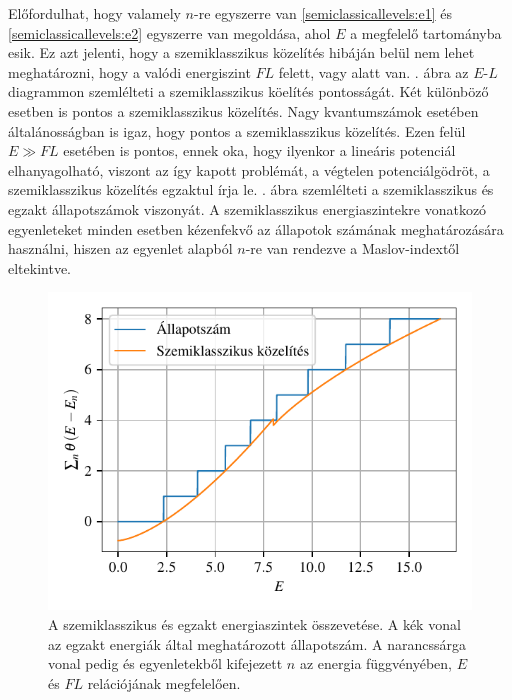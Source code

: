 Előfordulhat, hogy valamely $n$-re egyszerre van \eqref{semiclassicallevels:e1} és \eqref{semiclassicallevels:e2} egyszerre van megoldása, ahol $E$ a megfelelő tartományba esik. Ez azt jelenti, hogy a szemiklasszikus közelítés hibáján belül nem lehet meghatározni, hogy a valódi energiszint $FL$ felett, vagy alatt van. . ábra az $E$-$L$ diagrammon szemlélteti a szemiklasszikus köelítés pontosságát. Két különböző esetben is pontos a szemiklasszikus közelítés. Nagy kvantumszámok esetében általánosságban is igaz, hogy pontos a szemiklasszikus közelítés. Ezen felül $E\gg FL$ esetében is pontos, ennek oka, hogy ilyenkor a lineáris potenciál elhanyagolható, viszont az így kapott problémát, a végtelen potenciálgödröt, a szemiklasszikus közelítés egzaktul írja le. . ábra szemlélteti a szemiklasszikus és egzakt állapotszámok viszonyát. A szemiklasszikus energiaszintekre vonatkozó egyenleteket minden esetben kézenfekvő az állapotok számának meghatározására használni, hiszen az egyenlet alapból $n$-re van rendezve a Maslov-indextől eltekintve. 
\begin{figure}[H]
	\centering
	\includegraphics[scale=1]{./figs/allapotszam.pdf}
	\caption[Szemiklasszikus állapotszám]{A szemiklasszikus és egzakt energiaszintek összevetése. A kék vonal az egzakt energiák által meghatározott állapotszám. A narancssárga vonal pedig  és  egyenletekből kifejezett $n$ az energia függvényében, $E$ és $FL$ relációjának megfelelően.}
	\label{semiclassicallevels:allapotszam}
\end{figure}
